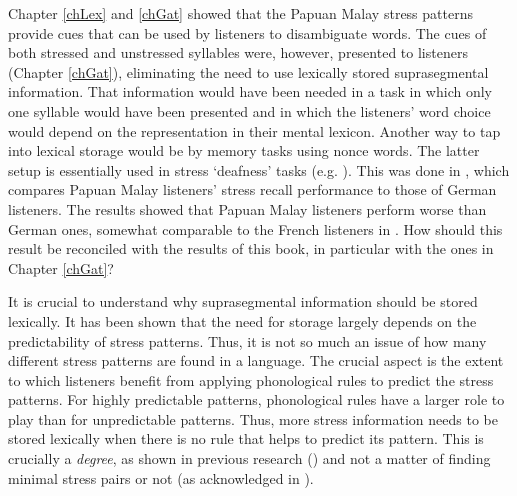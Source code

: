 Chapter \ref{chLex} and \ref{chGat} showed that the Papuan Malay stress patterns provide cues that can be used by listeners to disambiguate words. The cues of both stressed and unstressed syllables were, however, presented to listeners (Chapter \ref{chGat}), eliminating the need to use lexically stored suprasegmental information. That information would have been needed in a task in which only one syllable would have been presented and in which the listeners' word choice would depend on the representation in their mental lexicon. Another way to tap into lexical storage would be by memory tasks using nonce words. The latter setup is essentially used in stress `deafness' tasks (e.g. \citealt{dupoux_destressing_1997}). This was done in \citet{kaland_when_2024}, which compares Papuan Malay listeners' stress recall performance to those of German listeners. The results showed that Papuan Malay listeners perform worse than German ones, somewhat comparable to the French listeners in \citet{dupoux_destressing_1997}. How should this result be reconciled with the results of this book, in particular with the ones in Chapter \ref{chGat}?\par

It is crucial to understand why suprasegmental information should be stored lexically. It has been shown that the need for storage largely depends on the predictability of stress patterns. Thus, it is not so much an issue of how many different stress patterns are found in a language. The crucial aspect is the extent to which listeners benefit from applying phonological rules to predict the stress patterns. For highly predictable patterns, phonological rules have a larger role to play than for unpredictable patterns. Thus, more stress information needs to be stored lexically when there is no rule that helps to predict its pattern. This is crucially a \textit{degree}, as shown in previous research (\citealt{peperkamp_typological_2002}) and not a matter of finding minimal stress pairs or not (as acknowledged in \citealt{cutler_native_2012}).\par

